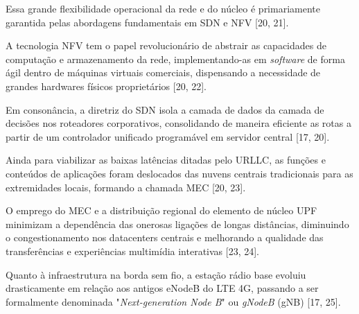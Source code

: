 \begin{figure}[ht!]
\centering
{}
\end{figure}

Essa grande flexibilidade operacional da rede e do núcleo é primariamente garantida pelas abordagens fundamentais em \gls{SDN} e \gls{NFV} [20, 21].

A tecnologia \gls{NFV} tem o papel revolucionário de abstrair as capacidades de computação e armazenamento da rede, implementando-as em \textit{software} de forma ágil dentro de máquinas virtuais comerciais, dispensando a necessidade de grandes hardwares físicos proprietários [20, 22].

Em consonância, a diretriz do \gls{SDN} isola a camada de dados da camada de decisões nos roteadores corporativos, consolidando de maneira eficiente as rotas a partir de um controlador unificado programável em servidor central [17, 20].

Ainda para viabilizar as baixas latências ditadas pelo \gls{URLLC}, as funções e conteúdos de aplicações foram deslocados das nuvens centrais tradicionais para as extremidades locais, formando a chamada \gls{MEC} [20, 23].

O emprego do \gls{MEC} e a distribuição regional do elemento de núcleo \gls{UPF} minimizam a dependência das onerosas ligações de longas distâncias, diminuindo o congestionamento nos datacenters centrais e melhorando a qualidade das transferências e experiências multimídia interativas [23, 24].

Quanto à infraestrutura na borda sem fio, a estação rádio base evoluiu drasticamente em relação aos antigos \gls{eNodeB} do \gls{LTE} \gls{4G}, passando a ser formalmente denominada "\textit{Next-generation Node B}" ou \textit{gNodeB} (\gls{gNB}) [17, 25].

